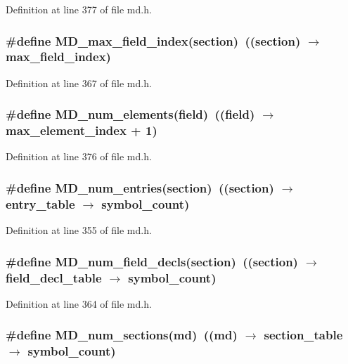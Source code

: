 Definition at line 377 of file md.h.
\subsubsection{\setlength{\rightskip}{0pt plus 5cm}\#define MD\_\-max\_\-field\_\-index(section)~((section) $\rightarrow$ max\_\-field\_\-index)}\label{md_8h_27b3fe7b97990ee32e688495cd29d7c1}




Definition at line 367 of file md.h.
\subsubsection{\setlength{\rightskip}{0pt plus 5cm}\#define MD\_\-num\_\-elements(field)~((field) $\rightarrow$ max\_\-element\_\-index + 1)}\label{md_8h_07dccd50803a2853d8d3d13f1b026261}




Definition at line 376 of file md.h.
\subsubsection{\setlength{\rightskip}{0pt plus 5cm}\#define MD\_\-num\_\-entries(section)~((section) $\rightarrow$ entry\_\-table $\rightarrow$ symbol\_\-count)}\label{md_8h_8147bf28dfbbf6ce27e9ecb06e6806fd}




Definition at line 355 of file md.h.
\subsubsection{\setlength{\rightskip}{0pt plus 5cm}\#define MD\_\-num\_\-field\_\-decls(section)~((section) $\rightarrow$ field\_\-decl\_\-table $\rightarrow$ symbol\_\-count)}\label{md_8h_b405ce465c85d74746867b5e59b9e5b4}




Definition at line 364 of file md.h.
\subsubsection{\setlength{\rightskip}{0pt plus 5cm}\#define MD\_\-num\_\-sections(md)~((md) $\rightarrow$ section\_\-table $\rightarrow$ symbol\_\-count)}\label{md_8h_48feb292fe2cf27ce730eb62b9d08221}




